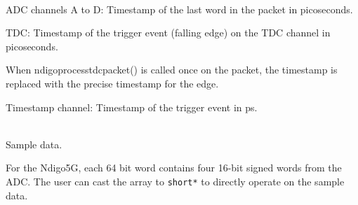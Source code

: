     \\
    ADC channels A to D: Timestamp of the last word in the packet in picoseconds.\par

    TDC: Timestamp of the trigger event (falling edge) on the TDC channel in picoseconds.\par

    When \textsf{ndigo\tu process\tu tdc\tu packet()} is called once on the packet, the timestamp is replaced with the precise timestamp for the edge.\par

    Timestamp channel: Timestamp of the trigger event in ps.\par

    \\
    Sample data.\par
    For the Ndigo5G, each 64 bit word contains four 16-bit signed words from the ADC. The user can cast the array to \texttt{short*} to directly operate on the sample data.